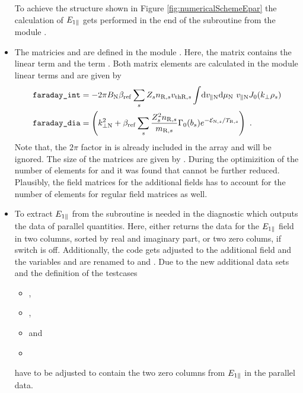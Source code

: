 \begin{itemize}
    To achieve the structure shown in Figure \ref{fig:numericalSchemeEpar} the calculation of $E_{1\parallel}$ gets performed in the end of the subroutine  from the module .
    \item The matricies  and  are defined in the module . Here, the matrix  contains the linear term  and  the term . Both matrix elements are calculated in the module linear terms and are given by
    \begin{gather}
        \begin{aligned}
            \texttt{faraday\_int} &= - 2\pi B_\mathrm{N} \beta_\mathrm{ref} \sum_s Z_s n_{\mathrm{R},s} v_{\mathrm{th}\mathrm{R},s} \int \! \mathrm{d}v_{\parallel \mathrm{N}} \mathrm{d}\mu_\mathrm{N} ~ v_{\parallel \mathrm{N}} J_0(k_\perp \rho_s)\\
            \texttt{faraday\_dia} &= \left(k_{\perp \mathrm{N}}^2 + \beta_\mathrm{ref} \sum_s \frac{Z^2_sn_{\mathrm{R},s}}{m_{\mathrm{R},s}} \Gamma_0(b_s) e^{-\mathcal{E}_{\mathrm{N},s}/T_{\mathrm{R},s}} \right)~.
        \end{aligned}
    \end{gather}
    Note that, the $2\pi$ factor in  is already included in the array  \cite{GKWManual} and will be ignored. The size of the matrices are given by . During the optimizition of the number of elements for  and  it was found that  cannot be further reduced. Plausibly, the field matrices for the additional fields has to account for the number of elements for regular field matrices as well.
    \item To extract $E_{1\parallel}$ from  the subroutine  is needed in the diagnostic  which outputs the data of parallel quantities. Here,  either returns the data for the $E_{1\parallel}$ field in two columns, sorted by real and imaginary part, or two zero colums, if  switch is off. Additionally, the code gets adjusted to the additional field and the variables  and  are renamed to  and . Due to the new additional data sets and the definition of  the testcases
    \begin{itemize}
        \item {},
        \item {},
        \item {} and
        \item {}
    \end{itemize}
    have to be adjusted to contain the two zero columns from $E_{1\parallel}$ in the parallel data.
\end{itemize}

